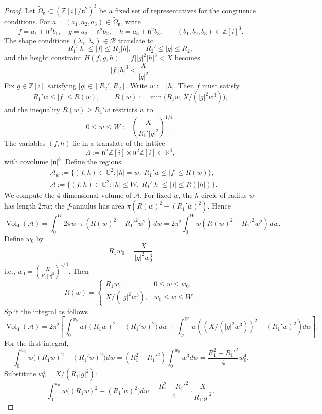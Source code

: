 \documentclass{amsart}
\newcommand{\C}{\mathbb{C}}
\newcommand{\R}{\mathbb{R}}
\newcommand{\Z}{\mathbb{Z}}
\theoremstyle{plain}
\theoremstyle{definition}
\theoremstyle{remark}
\numberwithin{equation}{section}
\begin{document}
\begin{proof}
Let $\widetilde{\Omega}_{\mathfrak n} \subset (\Z[i]/\mathfrak n^2)^3$ be a fixed set of representatives for the congruence conditions. For $a = (a_1,a_2,a_3) \in \widetilde{\Omega}_{\mathfrak n}$, write
\[
f = a_1 + \mathfrak n^2 b_1, \quad
g = a_2 + \mathfrak n^2 b_2, \quad
h = a_3 + \mathfrak n^2 b_3, \qquad (b_1,b_2,b_3)\in \Z[i]^3.
\]
\noindent The shape conditions $(\lambda_1,\lambda_2) \in \mathcal R$ translate to
\[
R_1' |h| \le |f| \le R_1 |h|, \qquad R_2' \le |g| \le R_2,
\]
and the height constraint $H(f,g,h) = |f||g|^2 |h|^3 < X$ becomes
\[
|f||h|^3 < \frac{X}{|g|^2}.
\] 
Fix $g \in \Z[i]$ satisfying $|g|\in [R_2',R_2]$. Write $w := |h|$. Then $f$ must satisfy
\[
R_1' w \le |f| \le R(w), \qquad R(w) := \min\Big(R_1 w, X/(|g|^2 w^3)\Big),
\]
and the inequality $R(w) \ge R_1' w$ restricts $w$ to
\[
0 \le w \le W := \left(\frac{X}{R_1' |g|^2}\right)^{1/4}.
\]
The variables $(f,h)$ lie in a translate of the lattice
\[
\Lambda := \mathfrak n^2 \Z[i] \times \mathfrak n^2 \Z[i] \subset \R^4,
\]
with covolume $|\mathfrak n|^8$. Define the regions
\[
\begin{split}&\mathcal A_w := \{(f,h) \in \C^2: |h| = w, \; R_1' w \le |f| \le R(w)\},\\
& \mathcal A:=\{(f,h) \in \C^2: |h|\leq W, \; R_1' |h| \le |f| \le R(|h|)\}.
\end{split}
\] 
We compute the 4-dimensional volume of $\mathcal A$. For fixed $w$, the $h$-circle of radius $w$ has length $2\pi w$; the $f$-annulus has area $\pi(R(w)^2 - (R_1'w)^2)$. Hence
\[
\operatorname{Vol}_4(\mathcal A) = \int_0^W 2 \pi w \cdot \pi (R(w)^2 - R_1'^2 w^2) \, dw 
= 2 \pi^2 \int_0^W w \left(R(w)^2 - R_1'^2 w^2\right) \, dw.
\]
Define $w_0$ by
\[
R_1 w_0 = \frac{X}{|g|^2 w_0^3}\] i.e., $w_0 = \left(\frac{X}{R_1 |g|^2}\right)^{1/4}$. Then
\[
R(w) =
\begin{cases}
R_1 w, & 0 \le w \le w_0,\\
X/(|g|^2 w^3), & w_0 \le w \le W.
\end{cases}
\]
Split the integral as follows
\[
\operatorname{Vol}_4(\mathcal A) = 2 \pi^2 \left[ \int_0^{w_0} w \bigl( (R_1 w)^2 - (R_1' w)^2\bigr)\, dw + \int_{w_0}^{W} w \left( (X/(|g|^2 w^3))^2 - (R_1' w)^2 \right) dw \right].
\]
For the first integral,
\[
\int_0^{w_0} w \bigl( (R_1 w)^2 - (R_1' w)^2\bigr) dw 
= (R_1^2 - R_1'^2) \int_0^{w_0} w^3 dw = \frac{R_1^2 - R_1'^2}{4} w_0^4.
\]
Substitute $w_0^4 = X/(R_1 |g|^2)$:
\[
\int_0^{w_0} w \bigl( (R_1 w)^2 - (R_1' w)^2\bigr) dw = \frac{R_1^2 - R_1'^2}{4} \cdot \frac{X}{R_1 |g|^2}.
\]
\end{proof}
\end{document}
